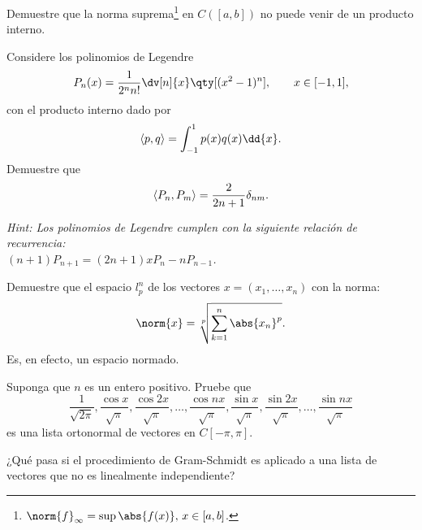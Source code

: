 \begin{ejercicio}
	Demuestre que la norma suprema\footnote{$\norm{f}_\infty = \sup{\abs{f(x)}, \, x \in [a,b]}$.} en $C([a,b])$ no puede venir de un producto interno.
\end{ejercicio}







\begin{ejercicio}
	Considere los polinomios de Legendre
		$$ P_n (x) = \frac{1}{2^n n!} \dv[n]{x} \qty[(x^2 - 1)^n], \qquad x\in [-1,1], $$
	con el producto interno dado por
		$$ \inner{p}{q} = \int _{-1} ^{1} p(x) q(x) \dd{x}. $$
	Demuestre que 
		$$ \langle P_n , P_m \rangle = \frac{2}{2n + 1} \delta _{nm}. $$
		
	\noindent \textit{Hint: Los polinomios de Legendre cumplen con la siguiente relación de recurrencia: \\ $(n + 1)P_{n + 1} = (2n + 1)xP_n - nP_{n - 1}$.}
\end{ejercicio}





\begin{ejercicio}
	Demuestre que el espacio $l^n _p$ de los vectores $x = (x_1 ,\ldots ,x_n)$ con la norma:
		$$ \norm{x} = \sqrt[p]{\sum _{k = 1} ^n \abs{x_n} ^p}. $$
	Es, en efecto, un espacio normado.
\end{ejercicio}





\begin{ejercicio}
	Suponga que $n$ es un entero positivo. Pruebe que 
		$$ \frac{1}{\sqrt{2\pi}}, \frac{\cos{x}}{\sqrt{\pi}}, \frac{\cos{2x}}{\sqrt{\pi}},\ldots ,\frac{\cos{nx}}{\sqrt{\pi}}, \frac{\sin{x}}{\sqrt{\pi}}, \frac{\sin{2x}}{\sqrt{\pi}},\ldots ,\frac{\sin{nx}}{\sqrt{\pi}}  $$
	es una lista ortonormal de vectores en $C[-\pi,\pi]$.
\end{ejercicio}










\begin{ejercicio}
	¿Qué pasa si el procedimiento de Gram-Schmidt es aplicado a una lista de vectores que no es linealmente independiente?
\end{ejercicio}



